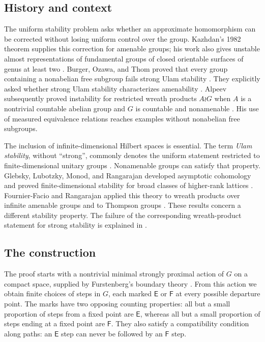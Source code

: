 \documentclass[11pt]{article}
\numberwithin{equation}{section}
\theoremstyle{definition}
\theoremstyle{remark}
\newcommand{\E}{\mathsf E}
\newcommand{\F}{\mathsf F}
\begin{document}
\subsection*{History and context}
The uniform stability problem asks whether an approximate homomorphism
can be corrected without losing uniform control over the group.
Kazhdan's 1982 theorem supplies this correction for amenable groups; his
work also gives unstable almost representations of fundamental groups
of closed orientable surfaces of genus at least two
\cite{Kazhdan,BurgerOzawaThom}. Burger, Ozawa, and Thom proved that every
group containing a nonabelian free subgroup fails strong Ulam stability
\cite[Theorem~1.2]{BurgerOzawaThom}. They explicitly asked whether strong
Ulam stability characterizes amenability \cite[p.~111]{BurgerOzawaThom}.
Alpeev subsequently proved instability for restricted wreath products
$A\wr G$ when $A$ is a nontrivial countable abelian group and $G$ is
countable and nonamenable \cite[Theorem~B]{Alpeev}. His use of measured
equivalence relations reaches examples without nonabelian free subgroups.

The inclusion of infinite-dimensional Hilbert spaces is essential.
The term \emph{Ulam stability}, without ``strong'', commonly denotes the
uniform statement restricted to finite-dimensional unitary groups
\cite[Definition~2.1]{BurgerOzawaThom}. Nonamenable groups can satisfy
that property. Glebsky, Lubotzky, Monod, and Rangarajan developed
asymptotic cohomology and proved finite-dimensional stability for broad
classes of higher-rank lattices \cite{GlebskyLubotzkyMonodRangarajan}.
Fournier-Facio and Rangarajan applied this theory to wreath products over
infinite amenable groups and to Thompson groups
\cite[Theorems~1.2 and~1.3]{FournierFacioRangarajan}. These results concern
a different stability property. The failure of the corresponding
wreath-product statement for strong stability is explained in
\cite[Remark~6.1]{FournierFacioRangarajan}.

\subsection*{The construction}
The proof starts with a nontrivial minimal strongly proximal action of $G$
on a compact space, supplied by Furstenberg's boundary theory
\cite{Furstenberg,KalantarKennedy}. From this action we obtain finite choices of steps in
$G$, each marked $\E$ or $\F$ at every possible departure point. The marks
have two opposing counting properties: all but a small proportion of
steps from a fixed point are $\E$, whereas all but a small proportion
of steps ending at a fixed point are $\F$.
They also satisfy a compatibility condition along paths: an $\E$ step
can never be followed by an $\F$ step.
\end{document}

